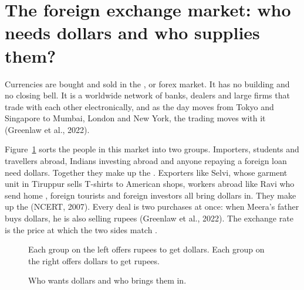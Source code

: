 \section{The foreign exchange market: who needs dollars and who supplies them?}

Currencies are bought and sold in the , or forex market. It has no building and no closing bell. It is a worldwide network of banks, dealers and large firms that trade with each other electronically, and as the day moves from Tokyo and Singapore to Mumbai, London and New York, the trading moves with it (Greenlaw et al., 2022).

Figure~\ref{fig:m1-flow} sorts the people in this market into two groups. Importers, students and travellers abroad, Indians investing abroad and anyone repaying a foreign loan need dollars. Together they make up the . Exporters like Selvi, whose garment unit in Tiruppur sells T-shirts to American shops, workers abroad like Ravi who send home , foreign tourists and foreign investors all bring dollars in. They make up the  (NCERT, 2007). Every deal is two purchases at once: when Meera's father buys dollars, he is also selling rupees (Greenlaw et al., 2022). The exchange rate is the price at which the two sides match .

\begin{figure}[!htb]
  \centering
  \resizebox{\linewidth}{!}{}
  \caption{Who wants dollars and who brings them in.}
  \label{fig:m1-flow}
  {\raggedright\small\sffamily Each group on the left offers rupees to get dollars. Each group on the right offers dollars to get rupees.\par}
\end{figure}

